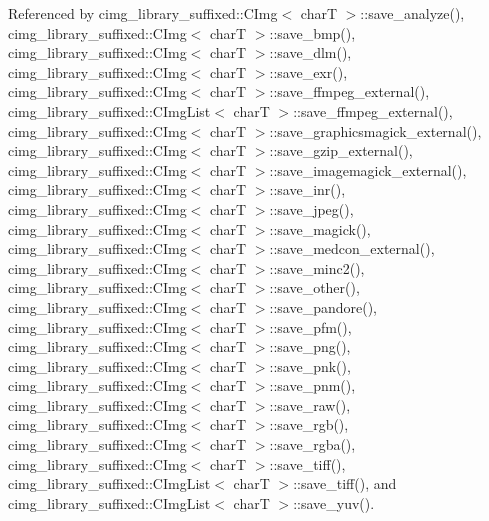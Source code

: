 Referenced by cimg\+\_\+library\+\_\+suffixed\+::\+C\+Img$<$ char\+T $>$\+::save\+\_\+analyze(), cimg\+\_\+library\+\_\+suffixed\+::\+C\+Img$<$ char\+T $>$\+::save\+\_\+bmp(), cimg\+\_\+library\+\_\+suffixed\+::\+C\+Img$<$ char\+T $>$\+::save\+\_\+dlm(), cimg\+\_\+library\+\_\+suffixed\+::\+C\+Img$<$ char\+T $>$\+::save\+\_\+exr(), cimg\+\_\+library\+\_\+suffixed\+::\+C\+Img$<$ char\+T $>$\+::save\+\_\+ffmpeg\+\_\+external(), cimg\+\_\+library\+\_\+suffixed\+::\+C\+Img\+List$<$ char\+T $>$\+::save\+\_\+ffmpeg\+\_\+external(), cimg\+\_\+library\+\_\+suffixed\+::\+C\+Img$<$ char\+T $>$\+::save\+\_\+graphicsmagick\+\_\+external(), cimg\+\_\+library\+\_\+suffixed\+::\+C\+Img$<$ char\+T $>$\+::save\+\_\+gzip\+\_\+external(), cimg\+\_\+library\+\_\+suffixed\+::\+C\+Img$<$ char\+T $>$\+::save\+\_\+imagemagick\+\_\+external(), cimg\+\_\+library\+\_\+suffixed\+::\+C\+Img$<$ char\+T $>$\+::save\+\_\+inr(), cimg\+\_\+library\+\_\+suffixed\+::\+C\+Img$<$ char\+T $>$\+::save\+\_\+jpeg(), cimg\+\_\+library\+\_\+suffixed\+::\+C\+Img$<$ char\+T $>$\+::save\+\_\+magick(), cimg\+\_\+library\+\_\+suffixed\+::\+C\+Img$<$ char\+T $>$\+::save\+\_\+medcon\+\_\+external(), cimg\+\_\+library\+\_\+suffixed\+::\+C\+Img$<$ char\+T $>$\+::save\+\_\+minc2(), cimg\+\_\+library\+\_\+suffixed\+::\+C\+Img$<$ char\+T $>$\+::save\+\_\+other(), cimg\+\_\+library\+\_\+suffixed\+::\+C\+Img$<$ char\+T $>$\+::save\+\_\+pandore(), cimg\+\_\+library\+\_\+suffixed\+::\+C\+Img$<$ char\+T $>$\+::save\+\_\+pfm(), cimg\+\_\+library\+\_\+suffixed\+::\+C\+Img$<$ char\+T $>$\+::save\+\_\+png(), cimg\+\_\+library\+\_\+suffixed\+::\+C\+Img$<$ char\+T $>$\+::save\+\_\+pnk(), cimg\+\_\+library\+\_\+suffixed\+::\+C\+Img$<$ char\+T $>$\+::save\+\_\+pnm(), cimg\+\_\+library\+\_\+suffixed\+::\+C\+Img$<$ char\+T $>$\+::save\+\_\+raw(), cimg\+\_\+library\+\_\+suffixed\+::\+C\+Img$<$ char\+T $>$\+::save\+\_\+rgb(), cimg\+\_\+library\+\_\+suffixed\+::\+C\+Img$<$ char\+T $>$\+::save\+\_\+rgba(), cimg\+\_\+library\+\_\+suffixed\+::\+C\+Img$<$ char\+T $>$\+::save\+\_\+tiff(), cimg\+\_\+library\+\_\+suffixed\+::\+C\+Img\+List$<$ char\+T $>$\+::save\+\_\+tiff(), and cimg\+\_\+library\+\_\+suffixed\+::\+C\+Img\+List$<$ char\+T $>$\+::save\+\_\+yuv().

